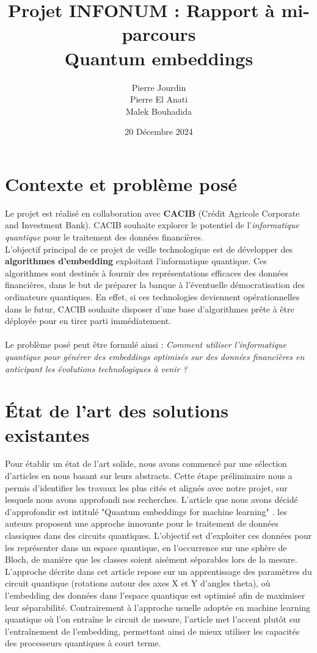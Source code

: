 \documentclass[11pt,a4paper]{article}
\title{\textbf{Projet INFONUM : Rapport à mi-parcours \\ Quantum embeddings}}
\author{Pierre Jourdin \\
        Pierre El Anati \\
        Malek Bouhadida}
\date{20 Décembre 2024}
\begin{document}
\maketitle
\tableofcontents
\newpage

\section{Contexte et problème posé}

Le projet est réalisé en collaboration avec \textbf{CACIB} (Crédit Agricole Corporate and Investment Bank). CACIB souhaite explorer le potentiel de l'\textit{informatique quantique} pour le traitement des données financières.
\\
L'objectif principal de ce projet de veille technologique est de développer des \textbf{algorithmes d'embedding} exploitant l'informatique quantique. Ces algorithmes sont destinés à fournir des représentations efficaces des données financières, dans le but de préparer la banque à l'éventuelle démocratisation des ordinateurs quantiques. En effet, si ces technologies deviennent opérationnelles dans le futur, CACIB souhaite disposer d'une base d'algorithmes prête à être déployée pour en tirer parti immédiatement.
\\\\
Le problème posé peut être formulé ainsi : \textit{Comment utiliser l'informatique quantique pour générer des embeddings optimisés sur des données financières en anticipant les évolutions technologiques à venir ?}


\section{État de l'art des solutions existantes}
Pour établir un état de l’art solide, nous avons commencé par une sélection d’articles en nous basant sur leurs abstracts. Cette étape préliminaire nous a permis d’identifier les travaux les plus cités et alignés avec notre projet, sur lesquels nous avons approfondi nos recherches.
L’article que nous avons décidé d’approfondir est intitulé "Quantum embeddings for machine learning" \cite{1}. les auteurs proposent une approche innovante pour le traitement de données classiques dans des circuits quantiques. L’objectif est d’exploiter ces données pour les représenter dans un espace quantique, en l’occurrence sur une sphère de Bloch, de manière que les classes soient aisément séparables lors de la mesure.
L’approche décrite dans cet article repose sur un apprentissage des paramètres du circuit quantique (rotations autour des axes X et Y d’angles theta), où l’embedding des données dans l’espace quantique est optimisé afin de maximiser leur séparabilité. Contrairement à l'approche usuelle adoptée en machine learning quantique où l'on entraîne le circuit de mesure, l’article met l’accent plutôt sur l’entraînement de l’embedding, permettant ainsi de mieux utiliser les capacités des processeurs quantiques à court terme.
\end{document}
